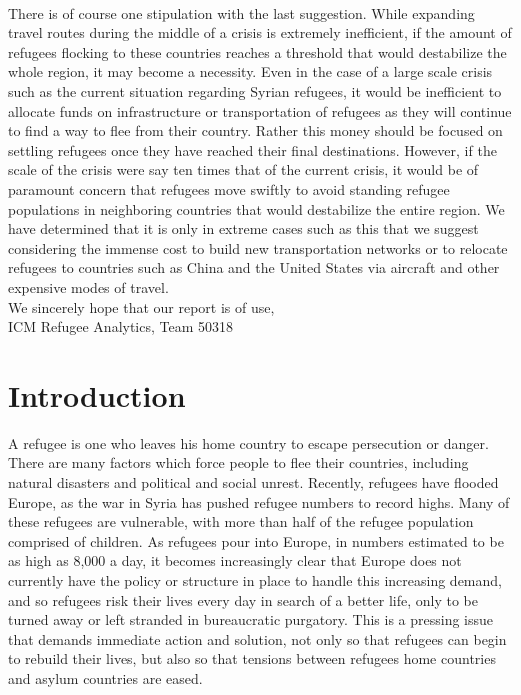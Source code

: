 \documentclass{article}
\begin{document}
\\
There is of course one stipulation with the last suggestion. While expanding travel routes during the middle of a crisis is extremely inefficient, if the amount of refugees flocking to these countries reaches a threshold that would destabilize the whole region, it may become a necessity. Even in the case of a large scale crisis such as the current situation regarding Syrian refugees, it would be inefficient to allocate funds on infrastructure or transportation of refugees as they will continue to find a way to flee from their country. Rather this money should be focused on settling refugees once they have reached their final destinations. However, if the scale of the crisis were say ten times that of the current crisis, it would be of paramount concern that refugees move swiftly to avoid standing refugee populations in neighboring countries that would destabilize the entire region. We have determined that it is only in extreme cases such as this that we suggest considering the immense cost to build new transportation networks or to relocate refugees to countries such as China and the United States via aircraft and other expensive modes of travel.\\
\noindent We sincerely hope that our report is of use,\\

\noindent ICM Refugee Analytics, Team 50318

\pagebreak

\setlength\parindent{0pt}

\section{Introduction}
A refugee is one who leaves his home country to escape persecution or danger\cite{10.2307/3002424}. There are many factors which force people to flee their countries, including natural disasters and political and social unrest. Recently, refugees have flooded Europe, as the war in Syria has pushed refugee numbers to record highs\cite{CNN2}. Many of these refugees are vulnerable, with more than half of the refugee population comprised of children\cite{CNN2}. As refugees pour into Europe, in numbers estimated to be as high as 8,000 a day\cite{BBC8000}, it becomes increasingly clear that Europe does not currently have the policy or structure in place to handle this increasing demand, and so refugees risk their lives every day in search of a better life, only to be turned away or left stranded in bureaucratic purgatory\cite{BBC8000}. This is a pressing issue that demands immediate action and solution, not only so that refugees can begin to rebuild their lives, but also so that tensions between refugees home countries and asylum countries are eased.
\end{document}
